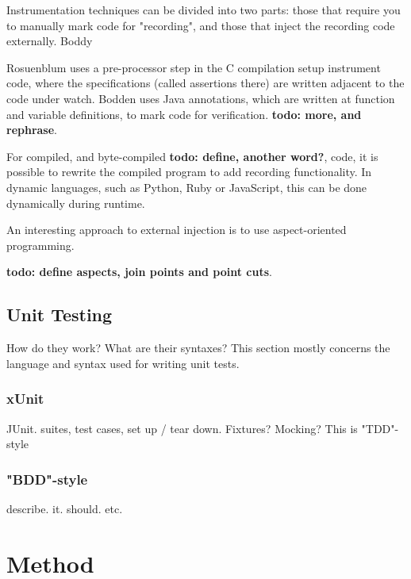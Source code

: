 \documentclass[a4paper,11pt]{kth-mag}
\newcommand{\todo}[1]{\textbf{todo: #1}}
\begin{document}
Instrumentation techniques can be divided into two parts: those that require you to manually
mark code for "recording", and those that inject the recording code externally. Boddy

Rosuenblum \cite{rosenblum95practicalassertions} uses a pre-processor step
in the C compilation setup instrument code, where the specifications (called assertions there)
are written adjacent to the code under watch. Bodden \cite{bodden05efficientrv} uses Java annotations, which are written at function and variable definitions, to mark code for verification. \todo{more, and rephrase}.

For compiled, and byte-compiled \todo{define, another word?}, code, it is possible to rewrite the 
compiled program to add recording functionality. In dynamic languages, such as Python, Ruby or JavaScript, this can be done dynamically during runtime.

An interesting approach to external injection is to use aspect-oriented programming.

\todo{define aspects, join points and point cuts}.


\section{Unit Testing}

How do they work? What are their syntaxes? This section mostly concerns the language and syntax used for writing unit tests.

\subsection{xUnit}

JUnit. suites, test cases, set up / tear down. Fixtures? Mocking? This is "TDD"-style

\subsection{"BDD"-style}

describe. it. should. etc.







\pagestyle{newchap}
\chapter{Method}
\end{document}

